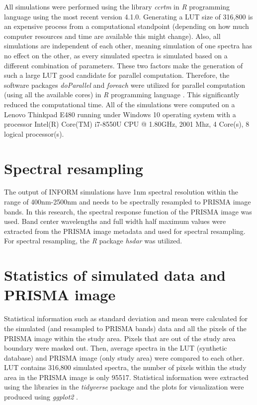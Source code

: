 \documentclass[a4paper, twoside]{templates/ociamthesis}
\begin{document}
All simulations were performed using the library \emph{ccrtm} \citep{ccrtm} in \emph{R} programming language \citep{r} using the most recent version 4.1.0. Generating a LUT size of 316,800 is an expensive process from a computational standpoint (depending on how much computer resources and time are available this might change). Also, all simulations are independent of each other, meaning simulation of one spectra has no effect on the other, as every simulated spectra is simulated based on a different combination of parameters. These two factors make the generation of such a large LUT good candidate for parallel computation. Therefore, the software packages \emph{doParallel} \citep{doparallel} and \emph{foreach} \citep{foreach} were utilized for parallel computation (using all the available cores) in \emph{R} programming language \citep{r}. This significantly reduced the computational time. All of the simulations were computed on a Lenovo Thinkpad E480 running under Windows 10 operating system with a processor Intel(R) Core(TM) i7-8550U CPU @ 1.80GHz, 2001 Mhz, 4 Core(s), 8 logical processor(s).

\hypertarget{spectral-resampling}{%
\section{Spectral resampling}\label{spectral-resampling}}

The output of INFORM simulations have 1nm spectral resolution within the range of 400nm-2500nm and needs to be spectrally resampled to PRISMA image bands. In this research, the spectral response function of the PRISMA image was used. Band center wavelengths and full width half maximum values were extracted from the PRISMA image metadata and used for spectral resampling. For spectral resampling, the \emph{R} package \emph{hsdar} \citep{hsdar} was utilized.

\hypertarget{statistics-of-simulated-data-and-prisma-image}{%
\section{Statistics of simulated data and PRISMA image}\label{statistics-of-simulated-data-and-prisma-image}}

Statistical information such as standard deviation and mean were calculated for the simulated (and resampled to PRISMA bands) data and all the pixels of the PRISMA image within the study area. Pixels that are out of the study area boundary were masked out. Then, average spectra in the LUT (synthetic database) and PRISMA image (only study area) were compared to each other. LUT contains 316,800 simulated spectra, the number of pixels within the study area in the PRISMA image is only 95517. Statistical information were extracted using the libraries in the \emph{tidyverse} package \citep{tidyverse} and the plots for visualization were produced using \emph{ggplot2} \citep{ggplot2}.
\end{document}

